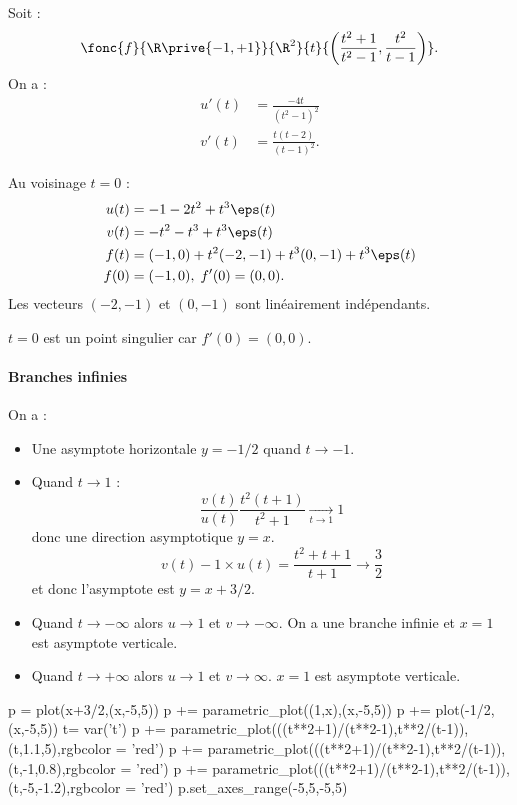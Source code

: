 Soit : \[ \fonc{f}{\R\prive{-1,+1}}{\R^{2}}{t}{\left(\frac{t^{2}+1}{t^{2}-1},\frac{t^{2}}{t-1}\right)}.\]
On a :
\begin{align*}
u'(t) &= \frac{-4t}{(t^{2}-1)^{2}}\\
v'(t) &= \frac{t(t-2)}{(t-1)^{2}}.
\end{align*}

Au voisinage $t=0$ :
\begin{align*}
u(t) &= -1-2t^{2}+t^{3}\eps(t) \\
v(t) &= -t^{2}-t^{3}+t^{3}\eps(t)\\
f(t) &= (-1,0) + t^{2}(-2,-1) + t^{3}(0,-1) + t^{3}\eps(t)\\
f(0) &= (-1,0), \; f'(0)= (0,0).
\end{align*}
Les vecteurs $(-2,-1)$ et $(0,-1)$ sont linéairement indépendants.


$t=0$ est un point singulier car $f'(0) = (0,0)$.
\paragraph{Branches infinies}On a :
\begin{itemize}
\item Une asymptote horizontale $y = -1/2$ quand $t\to -1$.
\item Quand $t\to 1$ : \[ \frac{v(t)}{u(t)} \frac{t^{2}(t+1)}{t^{2}+1} \underset{t\to 1}{\longrightarrow} 1\]donc une direction asymptotique $y=x$. \[ v(t) - 1\times u(t) = \frac{t^{2}+t+1}{t+1}\to \frac{3}{2}\]et donc l'asymptote est $y=x+3/2$.
\item Quand $t\to-\infty$ alors $u\to 1$ et $v\to-\infty$. On a une branche infinie et $x=1$ est asymptote verticale.
\item Quand $t\to+\infty$ alors $u\to 1$ et $v\to \infty$. $x=1$ est asymptote verticale.
\end{itemize}

\begin{sagesilent}
p = plot(x+3/2,(x,-5,5))
p += parametric_plot((1,x),(x,-5,5))
p += plot(-1/2,(x,-5,5))
t= var('t')
p += parametric_plot(((t**2+1)/(t**2-1),t**2/(t-1)),(t,1.1,5),rgbcolor = 'red')
p += parametric_plot(((t**2+1)/(t**2-1),t**2/(t-1)),(t,-1,0.8),rgbcolor = 'red')
p += parametric_plot(((t**2+1)/(t**2-1),t**2/(t-1)),(t,-5,-1.2),rgbcolor = 'red')
p.set_axes_range(-5,5,-5,5)
\end{sagesilent}
\begin{center}
\end{center}
